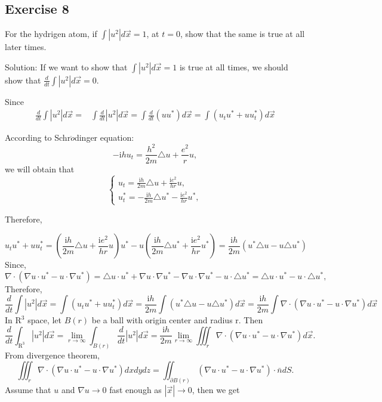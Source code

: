 \documentclass{article}
\begin{document}
		\subsection{Exercise 8}
	For the hydrigen atom, if $ \int \left | u^2 \right | d \vec{x } =1$, at $t=0$, show that the same is true at all later times.
		
		Solution: If we want to show that $ \int \left | u^2 \right | d \vec{x } =1$ is true at all times, we should show that $\frac{d}{dt}\int \left | u^2 \right | d \vec{x } =0$.
                  
		Since
		\begin{align*}
			 \frac{d}{dt}\int \left | u^2 \right | d \vec{x } =&
			 \int \frac{d}{dt} \left | u^2 \right | d \vec{x }=
			 \int \frac{d}{dt} \left(uu^* \right)d \vec{x }=
			 \int\left(  u_{t}u^*+uu_{t}^*\right) d \vec{x }
		\end{align*}

		According to Schr$\ddot{o}$dinger equation: 
		\[-\mathrm{i}hu_{t}=\frac{h^2}{2m}\triangle u+ \frac{e^2}{r}u,\]
		we will obtain that
		\begin{equation*}
			\begin{cases}
				u_{t}=\frac{\mathrm{i}h}{2m}\triangle u+ \frac{\mathrm{i}e^2}{hr}u,
				\\
				u_{t}^*=-\frac{\mathrm{i}h}{2m}\triangle u^*-\frac{\mathrm{i}e^2}{hr}u^*,
			\end{cases}
		\end{equation*}
		

		Therefore,

			\[u_{t}u^*+uu_{t}^*=(\frac{\mathrm{i}h}{2m}\triangle u+\frac{\mathrm{i}e^2}{hr}u)u^*-u(\frac{\mathrm{i}h}{2m}\triangle u^*+\frac{\mathrm{i}e^2}{hr}u^*)= \frac{\mathrm{i}h}{2m} (u^*\triangle u -u\triangle u^*) \]
			Since, \[\nabla \cdot (\nabla u \cdot u^* -u\cdot \nabla u^*)= \triangle u \cdot u^*+ \nabla u\cdot \nabla u^*- \nabla u\cdot \nabla u^*- u\cdot\triangle u^*=\triangle u \cdot u^*-u\cdot\triangle u^*,\]
			Therefore, \[ \frac{d}{dt}\int \left | u^2 \right | d \vec{x }=\int(u_{t}u^*+uu_{t}^*)  d \vec{x } = \frac{\mathrm{i}h}{2m}\int(u^*\triangle u -u\triangle u^*)d \vec{x }=\frac{\mathrm{i}h}{2m}\int \nabla \cdot (\nabla u \cdot u^* -u\cdot \nabla u^*)d \vec{x }\]
            In $\mathrm{R}^3$ space, let $B(r)$ be a ball with origin center and radius r.
			Then \[ \frac{d}{dt}\int_{\mathrm{R^3} }^{}  \left | u^2 \right | d \vec{x }= \lim_{r \to \infty}\int_{B(r)}\frac{d}{dt} \left | u^2 \right | d \vec{x }= \frac{\mathrm{i}h}{2m}\lim_{r \to \infty}\iiint_{r}^{} \nabla \cdot (\nabla u \cdot u^* -u\cdot \nabla u^*)d \vec{x }.\]
			From divergence theorem,
			\[\iiint_{r}^{} \nabla \cdot (\nabla u \cdot u^* -u\cdot \nabla u^*)dx dy dz= \iint_{\partial B(r)}^{}(\nabla u \cdot u^* -u\cdot \nabla u^*) \cdot \bar{n} dS.	\]
			Assume that $u$ and $\nabla u \to 0$ fast enough as $\left | \vec{x} \right | \to 0$, then we get
		
\end{document}
